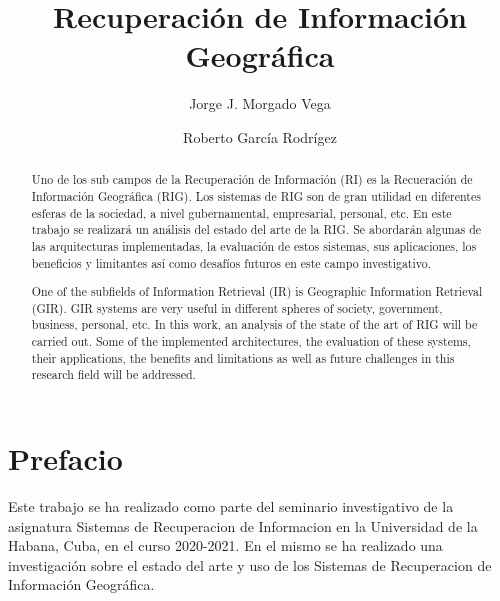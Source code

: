 \documentclass{llncs}
\begin{document}
\frontmatter
\chapter*{Prefacio}

Este trabajo se ha realizado como parte del seminario investigativo de la
asignatura Sistemas de Recuperacion de Informacion en la Universidad de
la Habana, Cuba, en el curso 2020-2021. En el mismo se ha realizado una
investigación sobre el estado del arte y uso de los Sistemas de Recuperacion
de Información Geográfica.

\pagestyle{headings}  %

\tableofcontents

\newpage

\mainmatter              %
%
\title{Recuperación de Información Geográfica}
%
%
\author{Jorge J. Morgado Vega \and Roberto García Rodrígez}
%
%
%

\maketitle              %

\renewcommand\abstractname{Resúmen.}
\renewcommand\keywordname{{\bf Palabras Claves:}}
\begin{abstract}
	Uno de los sub campos de la Recuperación de Información (RI) es la
	Recueración de Información Geográfica (RIG). Los sistemas de RIG son de
	gran utilidad en diferentes esferas de la sociedad, a nivel gubernamental,
	empresarial, personal, etc. En este trabajo se realizará un análisis del
	estado del arte de la RIG. Se abordarán algunas de las arquitecturas
	implementadas, la evaluación de estos sistemas, sus aplicaciones, los
	beneficios y limitantes así como desafíos futuros en este campo
	investigativo.
\end{abstract}
\renewcommand\abstractname{Abstract.}
\renewcommand\keywordname{{\bf Keywords:}}
\begin{abstract}
	One of the subfields of Information Retrieval (IR) is Geographic Information
	Retrieval (GIR). GIR systems are very useful in different spheres of society,
	government, business, personal, etc. In this work, an analysis of the state of
	the art of RIG will be carried out. Some of the implemented architectures, the
	evaluation of these systems, their applications, the benefits and limitations
	as well as future challenges in this research field will be addressed.
\end{abstract}
%
\end{document}
